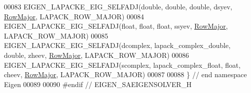 \begin{DoxyCode}
00083 EIGEN\_LAPACKE\_EIG\_SELFADJ(\textcolor{keywordtype}{double},   \textcolor{keywordtype}{double},                \textcolor{keywordtype}{double}, dsyev, 
      \hyperlink{group__enums_ggaacded1a18ae58b0f554751f6cdf9eb13acfcde9cd8677c5f7caf6bd603666aae3}{RowMajor}, LAPACK\_ROW\_MAJOR)
00084 EIGEN\_LAPACKE\_EIG\_SELFADJ(\textcolor{keywordtype}{float},    \textcolor{keywordtype}{float},                 \textcolor{keywordtype}{float},  ssyev, 
      \hyperlink{group__enums_ggaacded1a18ae58b0f554751f6cdf9eb13acfcde9cd8677c5f7caf6bd603666aae3}{RowMajor}, LAPACK\_ROW\_MAJOR)
00085 EIGEN\_LAPACKE\_EIG\_SELFADJ(dcomplex, lapack\_complex\_double, \textcolor{keywordtype}{double}, zheev, 
      \hyperlink{group__enums_ggaacded1a18ae58b0f554751f6cdf9eb13acfcde9cd8677c5f7caf6bd603666aae3}{RowMajor}, LAPACK\_ROW\_MAJOR)
00086 EIGEN\_LAPACKE\_EIG\_SELFADJ(scomplex, lapack\_complex\_float,  \textcolor{keywordtype}{float},  cheev, 
      \hyperlink{group__enums_ggaacded1a18ae58b0f554751f6cdf9eb13acfcde9cd8677c5f7caf6bd603666aae3}{RowMajor}, LAPACK\_ROW\_MAJOR)
00087 
00088 \} \textcolor{comment}{// end namespace Eigen}
00089 
00090 \textcolor{preprocessor}{#endif // EIGEN\_SAEIGENSOLVER\_H}
\end{DoxyCode}
